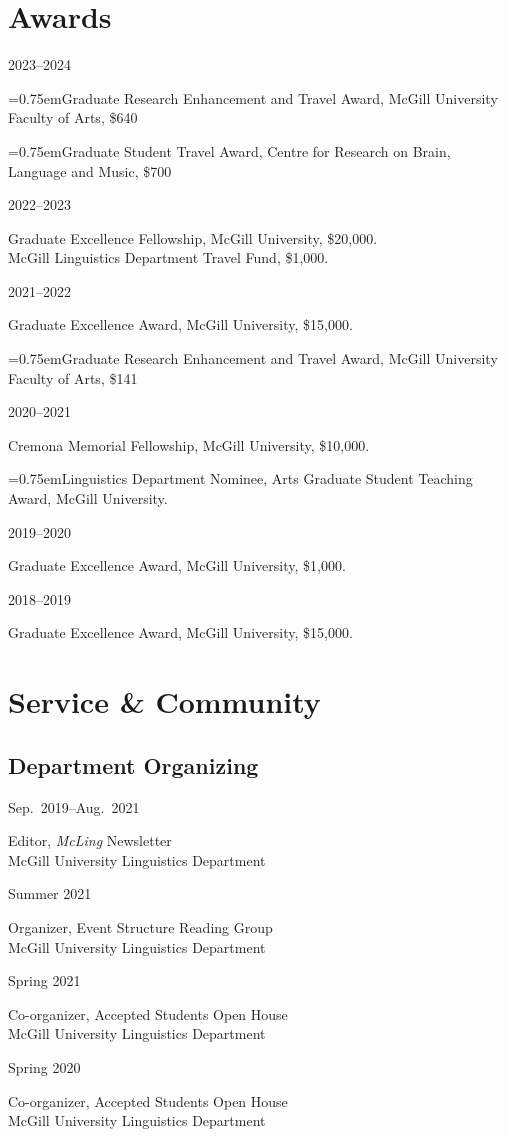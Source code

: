 \documentclass[11pt,oneside,DIV=calc,parskip=off]{scrarticle} %
\newlength{\leftcolwidth}
\newlength{\rightcolwidth}
\newlength{\spacingbefore}
\newlength{\spacingafter}
\newcommand{\hang}{\hangindent=0.75em\hangafter=1}
\newcommand{\mytwocol}[2]{%
	\vspace{\spacingbefore}%
	\begin{minipage}[t]{\leftcolwidth}%
		\strut#1%
	\end{minipage}%
	\begin{minipage}[t]{\rightcolwidth}%
		\strut#2%
	\end{minipage}%
	\vspace{\spacingafter}\par%
	}
\newcommand{\cvline}[2]{%
	\mytwocol{#1}{#2}%
	}
\begin{document}
\section{Awards}

\cvline{2023--2024}{\hang Graduate Research Enhancement and Travel Award, McGill University Faculty of Arts, \$640 \par \hang Graduate Student Travel Award, Centre for Research on Brain, Language and Music, \$700}
\cvline{2022--2023}{Graduate Excellence Fellowship, McGill University, \$20,000.\\McGill Linguistics Department Travel Fund, \$1,000.}
\cvline{2021--2022}{Graduate Excellence Award, McGill University, \$15,000.\par \hang Graduate Research Enhancement and Travel Award, McGill University Faculty of Arts, \$141}
\cvline{2020--2021}{Cremona Memorial Fellowship, McGill University, \$10,000.\par \hang Linguistics Department Nominee, Arts Graduate Student Teaching Award, McGill University.}
\cvline{2019--2020}{Graduate Excellence Award, McGill University, \$1,000.}
\cvline{2018--2019}{Graduate Excellence Award, McGill University, \$15,000.}


\section{Service \& Community}

\subsection{Department Organizing}
\cvline{Sep.\ 2019--Aug.\ 2021}{Editor, \textit{McLing} Newsletter\\McGill University Linguistics Department}
\cvline{Summer 2021}{Organizer, Event Structure Reading Group\\McGill University Linguistics Department}
\cvline{Spring 2021}{Co-organizer, Accepted Students Open House\\McGill University Linguistics Department}
\cvline{Spring 2020}{Co-organizer, Accepted Students Open House\\McGill University Linguistics Department}
\end{document}

